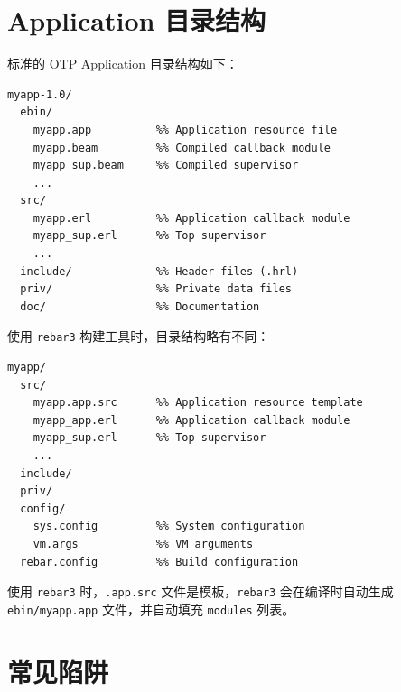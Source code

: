 \documentclass[a4paper,11pt]{article}
\begin{document}
\section{Application 目录结构}

标准的 OTP Application 目录结构如下：

\begin{lstlisting}[style=erlangstyle, caption={标准 OTP Application 目录结构}]
myapp-1.0/
  ebin/
    myapp.app          %% Application resource file
    myapp.beam         %% Compiled callback module
    myapp_sup.beam     %% Compiled supervisor
    ...
  src/
    myapp.erl          %% Application callback module
    myapp_sup.erl      %% Top supervisor
    ...
  include/             %% Header files (.hrl)
  priv/                %% Private data files
  doc/                 %% Documentation
\end{lstlisting}

使用 \texttt{rebar3} 构建工具时，目录结构略有不同：

\begin{lstlisting}[style=erlangstyle, caption={rebar3 项目目录结构}]
myapp/
  src/
    myapp.app.src      %% Application resource template
    myapp_app.erl      %% Application callback module
    myapp_sup.erl      %% Top supervisor
    ...
  include/
  priv/
  config/
    sys.config         %% System configuration
    vm.args            %% VM arguments
  rebar.config         %% Build configuration
\end{lstlisting}

\begin{notebox}
使用 \texttt{rebar3} 时，\texttt{.app.src} 文件是模板，\texttt{rebar3} 会在编译时自动生成 \texttt{ebin/myapp.app} 文件，并自动填充 \texttt{modules} 列表。
\end{notebox}


\section{常见陷阱}
\end{document}
